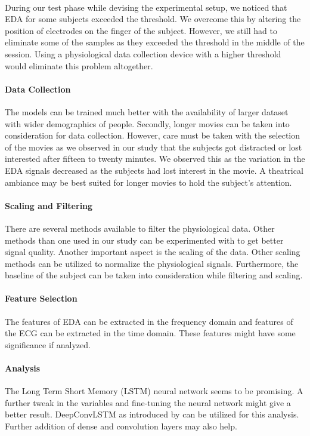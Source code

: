 \paragraph{} During our test phase while devising the experimental setup, we noticed that EDA for some subjects exceeded the threshold. We overcome this by altering the position of electrodes on the finger of the subject. However, we still had to eliminate some of the samples as they exceeded the threshold in the middle of the session. Using a physiological data collection device with a higher threshold would eliminate this problem altogether.

\paragraph{Data Collection} The models can be trained much better with the availability of larger dataset with wider demographics of people. Secondly, longer movies can be taken into consideration for data collection. However, care must be taken with the selection of the movies as we observed in our study that the subjects got distracted or lost interested after fifteen to twenty minutes. We observed this as the variation in the EDA signals decreased as the subjects had lost interest in the movie. A theatrical ambiance may be best suited for longer movies to hold the subject's attention.

\paragraph{Scaling and Filtering} There are several methods available to filter the physiological data. Other methods than one used in our study can be experimented with to get better signal quality. Another important aspect is the scaling of the data. Other scaling methods can be utilized to normalize the physiological signals. Furthermore, the baseline of the subject can be taken into consideration while filtering and scaling.

\paragraph{Feature Selection} The features of EDA can be extracted in the frequency domain and features of the ECG can be extracted in the time domain. These features might have some significance if analyzed.

\paragraph{Analysis} The Long Term Short Memory (LSTM) neural network seems to be promising. A further tweak in the variables and fine-tuning the neural network might give a better result. DeepConvLSTM as introduced by \citeauthor{ordonez_deep_2016} can be utilized for this analysis. Further addition of dense and convolution layers may also help.

